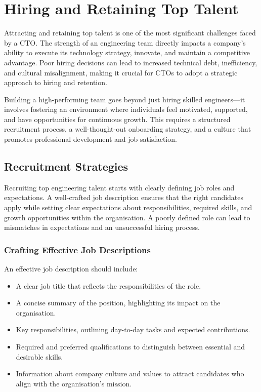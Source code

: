 \section{Hiring and Retaining Top Talent}

Attracting and retaining top talent is one of the most significant challenges faced by a CTO. The strength of an engineering team directly impacts a company’s ability to execute its technology strategy, innovate, and maintain a competitive advantage. Poor hiring decisions can lead to increased technical debt, inefficiency, and cultural misalignment, making it crucial for CTOs to adopt a strategic approach to hiring and retention.

Building a high-performing team goes beyond just hiring skilled engineers—it involves fostering an environment where individuals feel motivated, supported, and have opportunities for continuous growth. This requires a structured recruitment process, a well-thought-out onboarding strategy, and a culture that promotes professional development and job satisfaction.

\subsection{Recruitment Strategies}

Recruiting top engineering talent starts with clearly defining job roles and expectations. A well-crafted job description ensures that the right candidates apply while setting clear expectations about responsibilities, required skills, and growth opportunities within the organisation. A poorly defined role can lead to mismatches in expectations and an unsuccessful hiring process.

\subsubsection{Crafting Effective Job Descriptions}

An effective job description should include:

\begin{itemize}
    \item A clear job title that reflects the responsibilities of the role.
    \item A concise summary of the position, highlighting its impact on the organisation.
    \item Key responsibilities, outlining day-to-day tasks and expected contributions.
    \item Required and preferred qualifications to distinguish between essential and desirable skills.
    \item Information about company culture and values to attract candidates who align with the organisation’s mission.
\end{itemize}

